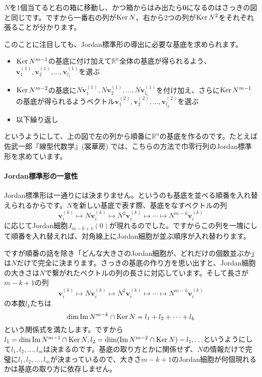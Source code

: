 $N$を$1$個当てると右の箱に移動し、かつ箱からはみ出たら$\bm{0}$になるのはさっきの図と同じです。ですから一番右の列が$\operatorname{Ker} N$、右から$2$つの列が$\operatorname{Ker} N^2$をそれぞれ張ることが分かります。

このことに注目しても、Jordan標準形の導出に必要な基底を求められます。
\begin{itemize}
\item $\operatorname{Ker} N^{m - 1}$の基底に付け加えて$\mathbb{R}^n$全体の基底が得られるよう、$\bm{v}^{(1)}_1, \bm{v}^{(1)}_2, \ldots, \bm{v}^{(1)}_{l_1}$を選ぶ
\item $\operatorname{Ker} N^{m - 2}$の基底に$N\bm{v}^{(1)}_1, N\bm{v}^{(1)}_2, \ldots, N\bm{v}^{(1)}_{l_1}$を付け加え、さらに$\operatorname{Ker} N^{m - 1}$の基底が得られるようベクトル$\bm{v}^{(2)}_1, \bm{v}^{(2)}_2, \ldots, \bm{v}^{(2)}_{l_2}$を選ぶ
\item 以下繰り返し
\end{itemize}
というようにして、上の図で左の列から順番に$\mathbb{R}^n$の基底を作るのです。たとえば佐武一郎『線型代数学』(裳華房) では、こちらの方法で巾零行列のJordan標準形を求めています。

\paragraph{Jordan標準形の一意性}

Jordan標準形は一通りには決まりません。というのも基底を並べる順番を入れ替えられるからです。$N$を新しい基底で表す際、基底をなすベクトルの列
\[
\bm{v}^{(k)}_i \mapsto N \bm{v}^{(k)}_i \mapsto N^2 \bm{v}^{(k)}_i \mapsto \cdots \mapsto N^{m - k} \bm{v}^{(k)}_i
\]
に応じてJordan細胞$J_{m - k + 1}(0)$が現れるのでした。ですからこの列を一塊にして順番を入れ替えれば、対角線上にJordan細胞が並ぶ順序が入れ替わります。

ですが順番の話を除き「どんな大きさのJordan細胞が、どれだけの個数並ぶか」は$N$だけで完全に決まります。さっきの基底の作り方を思い出すと、Jordan細胞の大きさは$N$で繋がれたベクトルの列の長さに対応しています。そして長さが$m - k + 1$の列
\[
\bm{v}^{(k)}_i \mapsto N \bm{v}^{(k)}_i \mapsto N^2 \bm{v}^{(k)}_i \mapsto \cdots \mapsto N^{m - k} \bm{v}^{(k)}_i
\]
の本数$l_k$たちは
\[
\dim \mathrm{Im}\, N^{m - k} \cap \operatorname{Ker} N = l_1 + l_2 + \cdots + l_k
\]
という関係式を満たします。ですから$l_1 = \dim \mathrm{Im}\, N^{m - 1} \cap \operatorname{Ker} N, l_2 = \dim (\mathrm{Im}\, N^{m - 2} \cap \operatorname{Ker} N) - l_1, \ldots$というようにして$l_1, l_2, \ldots, l_m$は決まるのです。基底の取り方とかに関係せず、$N$の情報だけで完璧に$l_1, l_2, \ldots, l_m$が決まっているので、大きさ$m - k + 1$のJordan細胞が何個現れるかは基底の取り方に依存しません。

